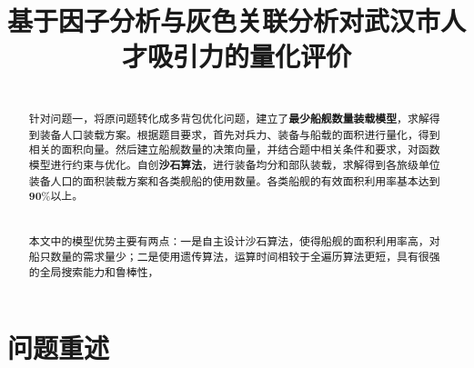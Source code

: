 \documentclass{whutmod}
\title{基于因子分析与灰色关联分析对武汉市人才吸引力的量化评价}
\begin{document}
	
	\begin{abstract}

~\\

针对问题一，将原问题转化成多背包优化问题，建立了\textbf{最少船舰数量装载模型}，求解得到装备人口装载方案。根据题目要求，首先对兵力、装备与船载的面积进行量化，得到相关的面积向量。然后建立船舰数量的决策向量，并结合题中相关条件和要求，对函数模型进行约束与优化。自创\textbf{沙石算法}，进行装备均分和部队装载，求解得到各旅级单位装备人口的面积装载方案和各类舰船的使用数量。各类船舰的有效面积利用率基本达到$\textbf{90\%}$以上。
~\\


~\\

~\\

本文中的模型优势主要有两点：一是自主设计沙石算法，使得船舰的面积利用率高，对船只数量的需求量少；二是使用遗传算法，运算时间相较于全遍历算法更短，具有很强的全局搜索能力和鲁棒性，
	
  
		
	\end{abstract}
	
	\tableofcontents
	\newpage	%
	
	\section{问题重述}	
\end{document}

